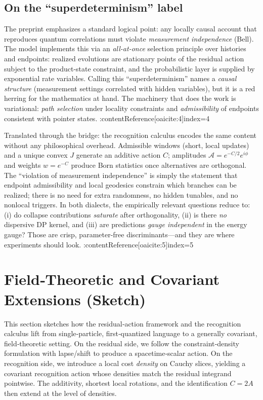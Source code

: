 \documentclass[11pt,letterpaper]{article}
\begin{document}
\subsection*{On the ``superdeterminism'' label}

The preprint emphasizes a standard logical point: any locally causal account that reproduces quantum correlations must violate \emph{measurement independence} (Bell). The model implements this via an \emph{all-at-once} selection principle over histories and endpoints: realized evolutions are stationary points of the residual action subject to the product-state constraint, and the probabilistic layer is supplied by exponential rate variables. Calling this ``superdeterminism'' names a \emph{causal structure} (measurement settings correlated with hidden variables), but it is a red herring for the mathematics at hand. The machinery that does the work is variational: \emph{path selection} under locality constraints and \emph{admissibility} of endpoints consistent with pointer states. :contentReference[oaicite:4]{index=4}

Translated through the bridge: the recognition calculus encodes the same content without any philosophical overhead. Admissible windows (short, local updates) and a unique convex $J$ generate an additive action $C$; amplitudes $\mathcal A=e^{-C/2}e^{i\phi}$ and weights $w=e^{-C}$ produce Born statistics once alternatives are orthogonal. The ``violation of measurement independence'' is simply the statement that endpoint admissibility and local geodesics constrain which branches can be realized; there is no need for extra randomness, no hidden tunables, and no nonlocal triggers. In both dialects, the empirically relevant questions reduce to: (i) do collapse contributions \emph{saturate} after orthogonality, (ii) is there \emph{no} dispersive DP kernel, and (iii) are predictions \emph{gauge independent} in the energy gauge? Those are crisp, parameter-free discriminants—and they are where experiments should look. :contentReference[oaicite:5]{index=5}

\section{Field‑Theoretic and Covariant Extensions (Sketch)}

This section sketches how the residual‑action framework and the recognition calculus lift from single‑particle, first‑quantized language to a generally covariant, field‑theoretic setting. On the residual side, we follow the constraint‑density formulation with lapse/shift to produce a spacetime‑scalar action. On the recognition side, we introduce a local cost \emph{density} on Cauchy slices, yielding a covariant recognition action whose densities match the residual integrand pointwise. The additivity, shortest local rotations, and the identification \(C=2A\) then extend at the level of densities.
\end{document}

